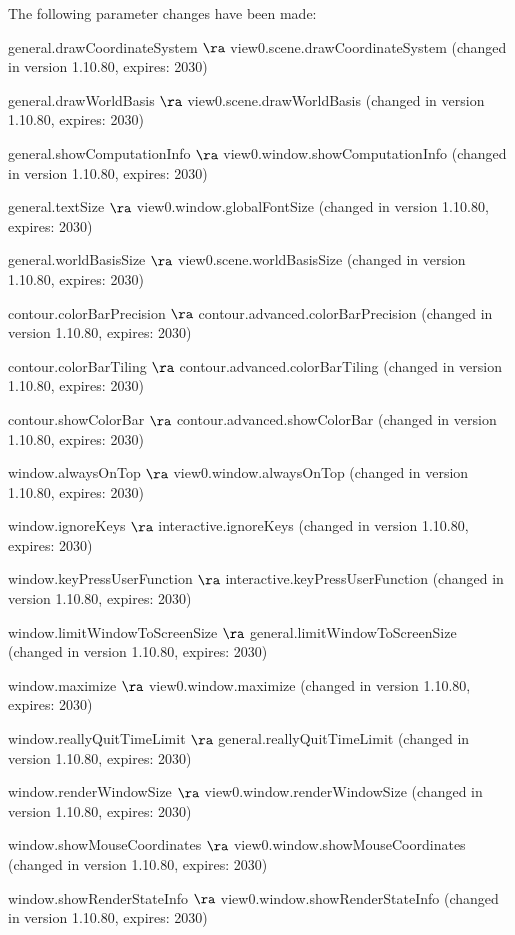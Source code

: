 The following parameter changes have been made:
\bi
  \item general.drawCoordinateSystem $\ra$ view0.scene.drawCoordinateSystem (changed in version 1.10.80, expires: 2030)
  \item general.drawWorldBasis $\ra$ view0.scene.drawWorldBasis (changed in version 1.10.80, expires: 2030)
  \item general.showComputationInfo $\ra$ view0.window.showComputationInfo (changed in version 1.10.80, expires: 2030)
  \item general.textSize $\ra$ view0.window.globalFontSize (changed in version 1.10.80, expires: 2030)
  \item general.worldBasisSize $\ra$ view0.scene.worldBasisSize (changed in version 1.10.80, expires: 2030)
  \item contour.colorBarPrecision $\ra$ contour.advanced.colorBarPrecision (changed in version 1.10.80, expires: 2030)
  \item contour.colorBarTiling $\ra$ contour.advanced.colorBarTiling (changed in version 1.10.80, expires: 2030)
  \item contour.showColorBar $\ra$ contour.advanced.showColorBar (changed in version 1.10.80, expires: 2030)
  \item window.alwaysOnTop $\ra$ view0.window.alwaysOnTop (changed in version 1.10.80, expires: 2030)
  \item window.ignoreKeys $\ra$ interactive.ignoreKeys (changed in version 1.10.80, expires: 2030)
  \item window.keyPressUserFunction $\ra$ interactive.keyPressUserFunction (changed in version 1.10.80, expires: 2030)
  \item window.limitWindowToScreenSize $\ra$ general.limitWindowToScreenSize (changed in version 1.10.80, expires: 2030)
  \item window.maximize $\ra$ view0.window.maximize (changed in version 1.10.80, expires: 2030)
  \item window.reallyQuitTimeLimit $\ra$ general.reallyQuitTimeLimit (changed in version 1.10.80, expires: 2030)
  \item window.renderWindowSize $\ra$ view0.window.renderWindowSize (changed in version 1.10.80, expires: 2030)
  \item window.showMouseCoordinates $\ra$ view0.window.showMouseCoordinates (changed in version 1.10.80, expires: 2030)
  \item window.showRenderStateInfo $\ra$ view0.window.showRenderStateInfo (changed in version 1.10.80, expires: 2030)
